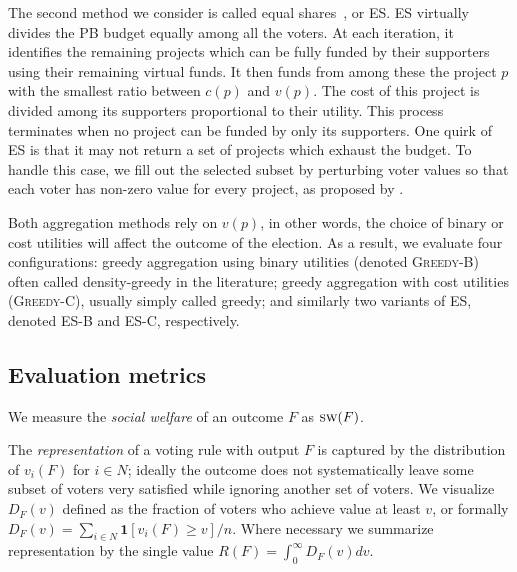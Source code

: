 \documentclass[mnsc,blindrev]{informs3_freeuse} %
\newcommand{\kibitz}[2]{\ifnum\Comments=1{\color{#1}{#2}}\fi}
\newcommand{\gb}[1]{\kibitz{red}{[GB:#1]}}
\newcommand{\sw}{\textsc{sw}}
\newcommand{\mes}{ES}
\begin{document}
 The  second method we consider is called equal shares~\citep{PS20}, %
 or \mes{}.  
\mes{} virtually  divides the PB budget equally among all the voters. 
At each iteration, it identifies the remaining projects which can be fully funded by their supporters using their remaining virtual funds.
It then funds from among these the  project $p$ with the smallest ratio between $c(p)$ and $v(p)$. 
The cost of this project is divided among its supporters proportional to their utility. 
This process terminates when no project can be funded by only its supporters. 
One quirk of \mes{} is that it may not return a set of projects which exhaust the budget. To handle this case, we fill out the selected subset by perturbing voter values so that each voter has non-zero value for every project, as proposed by  \citet{peters2021proportional}. 

Both aggregation methods rely on $v(p)$, in other words, the choice of binary or cost utilities will affect the outcome of the election. As a result, we evaluate four configurations:  greedy aggregation using binary utilities (denoted \textsc{Greedy-B}) often called density-greedy in the literature;   greedy aggregation with cost utilities (\textsc{Greedy-C}), usually simply called greedy; and similarly two variants of ES, denoted \textsc{ES-B} and \textsc{ES-C}, respectively. 


\subsection{Evaluation metrics}
We measure the \emph{social welfare} of an outcome $F$ as $\sw(F)$. 

The \emph{representation} of a voting rule with output $F$ is captured by the distribution of $v_i(F)$ for $i\in N$; ideally the outcome does not systematically leave some subset of voters very satisfied while ignoring another set of voters. 
We visualize $D_F(v)$ defined as the fraction of voters who achieve value at least $v$, or formally $D_F(v) = \sum_{i\in N} \mathbf{1}[v_i(F) \geq v] / n.$ Where necessary we summarize representation by the single value $R(F) = \int_0^\infty D_F(v) dv$.
\end{document}

